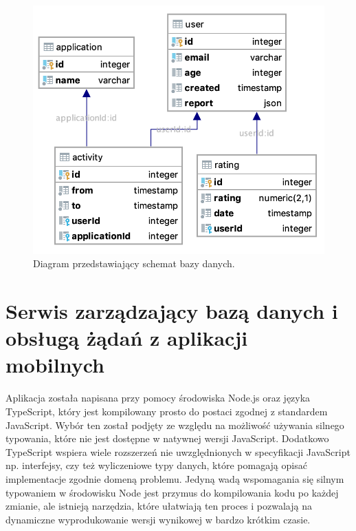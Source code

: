 \documentclass[a4paper,twoside,12pt]{book}
\begin{document}
\begin{figure}[h!]
    \centering
    \includegraphics[width=\textwidth]{images/db_schema.png}
    \caption{Diagram przedstawiający schemat bazy danych.}
    \label{fig:bd}
\end{figure}


\section{Serwis zarządzający bazą danych i obsługą żądań z aplikacji mobilnych}
\label{nodejs}
Aplikacja została napisana przy pomocy środowiska Node.js oraz języka TypeScript, który jest kompilowany prosto do postaci zgodnej z standardem JavaScript. Wybór ten został podjęty ze względu na możliwość używania silnego typowania, które nie jest dostępne w natywnej wersji JavaScript. Dodatkowo TypeScript wspiera wiele rozszerzeń nie uwzględnionych w  specyfikacji JavaScript np. interfejsy, czy też wyliczeniowe typy danych, które pomagają opisać implementacje zgodnie domeną problemu. Jedyną wadą wspomagania się silnym typowaniem w środowisku Node jest przymus do kompilowania kodu po każdej zmianie, ale istnieją narzędzia, które ułatwiają ten proces i pozwalają na dynamiczne wyprodukowanie wersji wynikowej w bardzo krótkim czasie.
\end{document}

